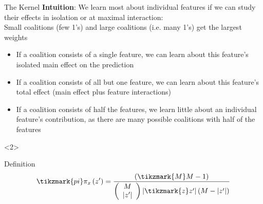 \documentclass[10pt,compress,t,notes=noshow, xcolor=table]{beamer}
\begin{document}
\begin{vbframe}{The Kernel}
\textbf{Intuition}: We learn most about individual features if we can study their effects in isolation or at maximal interaction:\\
Small coalitions (few 1’s) and large coalitions (i.e. many 1’s) get the largest weights
\begin{itemize}
    \item If a coalition consists of a single feature, we can learn about this feature’s isolated main effect on the prediction
    \item If a coalition consists of all but one feature, we can learn about this feature’s total effect (main effect plus feature interactions)
    \item If a coalition consists of half the features, we learn little about an individual feature’s contribution, as there are many possible coalitions with half of the features
\end{itemize}

\begin{onlyenv}<2>
\begin{exampleblock}{Definition}
\[
\tikzmark{pi}\pi_{x}\left(z^{\prime}\right)=\frac{(
\tikzmark{M}M-1)}{\left(\begin{array}{c} M \\\left|z^{\prime}\right|\end{array}\right)\left|
\tikzmark{z}z^{\prime}\right|\left(M-\left|z^{\prime}\right|\right)}
\]
\end{exampleblock}
\end{onlyenv}





\end{vbframe}
\end{document}
